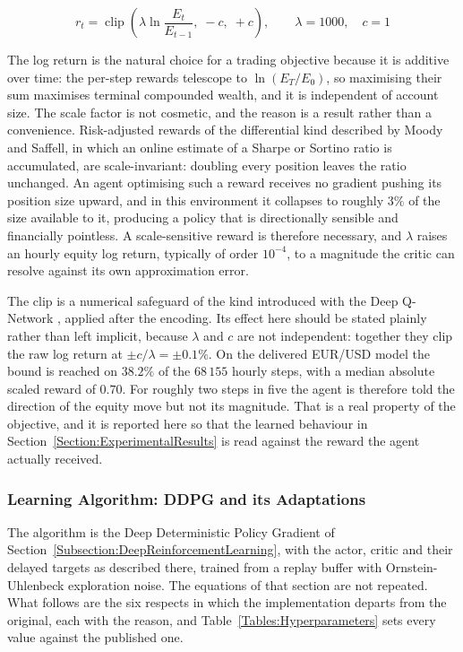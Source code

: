 \begin{equation}
r_t = \operatorname{clip}\!\left(\lambda \ln\!\frac{E_t}{E_{t-1}},\; -c,\; +c\right), \qquad \lambda = 1000, \quad c = 1
\label{Equation:Reward}
\end{equation}

The log return is the natural choice for a trading objective because it is additive over time: the per-step rewards telescope to $\ln(E_T / E_0)$, so maximising their sum maximises terminal compounded wealth, and it is independent of account size. The scale factor is not cosmetic, and the reason is a result rather than a convenience. Risk-adjusted rewards of the differential kind described by Moody and Saffell, in which an online estimate of a Sharpe or Sortino ratio is accumulated, are scale-invariant: doubling every position leaves the ratio unchanged. An agent optimising such a reward receives no gradient pushing its position size upward, and in this environment it collapses to roughly $3\%$ of the size available to it, producing a policy that is directionally sensible and financially pointless. A scale-sensitive reward is therefore necessary, and $\lambda$ raises an hourly equity log return, typically of order $10^{-4}$, to a magnitude the critic can resolve against its own approximation error.

The clip is a numerical safeguard of the kind introduced with the Deep Q-Network \cite{mnih_human-level_2015}, applied after the encoding. Its effect here should be stated plainly rather than left implicit, because $\lambda$ and $c$ are not independent: together they clip the raw log return at $\pm c / \lambda = \pm 0.1\%$. On the delivered EUR/USD model the bound is reached on $38.2\%$ of the $68\,155$ hourly steps, with a median absolute scaled reward of $0.70$. For roughly two steps in five the agent is therefore told the direction of the equity move but not its magnitude. That is a real property of the objective, and it is reported here so that the learned behaviour in Section~\ref{Section:ExperimentalResults} is read against the reward the agent actually received.

\subsubsection{Learning Algorithm: DDPG and its Adaptations}

The algorithm is the Deep Deterministic Policy Gradient of Section~\ref{Subsection:DeepReinforcementLearning}, with the actor, critic and their delayed targets as described there, trained from a replay buffer with Ornstein-Uhlenbeck exploration noise. The equations of that section are not repeated. What follows are the six respects in which the implementation departs from the original, each with the reason, and Table~\ref{Tables:Hyperparameters} sets every value against the published one.

